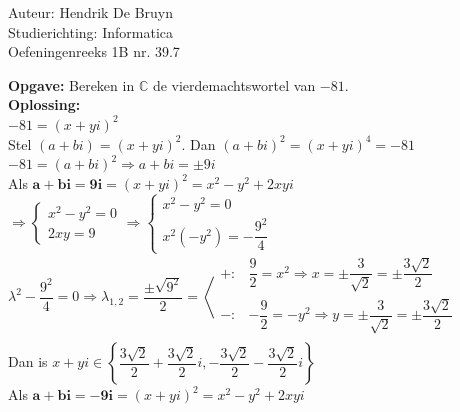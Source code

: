 \documentclass[a4paper]{article}
\begin{document}
\noindent \large Auteur: Hendrik De Bruyn \\
\noindent \large Studierichting: Informatica\\
\noindent \large Oefeningenreeks 1B nr. 39.7\\

\medskip

\normalsize

\textbf{Opgave: } Bereken in $\mathbb{C}$ de vierdemachtswortel van $-81$. \\

\textbf{Oplossing: } \\

$-81 = (x+yi)^2$ \\

Stel $(a+bi) = (x+yi)^2$. Dan $(a+bi)^2 = (x+yi)^4 = -81$ \\

$-81 = (a+bi)^2 \Rightarrow a+bi = \pm 9i$ \\

Als $\pmb{a+bi = 9i} = (x+yi)^2 = x^2 - y^2 + 2xyi $ \\

$\Rightarrow \left\{\begin{array}{l}
		x^2 - y^2 = 0 \\
		2xy = 9
	\end{array}\right. \Rightarrow \left\{\begin{array}{l}
		x^2 - y^2 = 0 \\
		x^2(-y^2) = -\dfrac{9^2}{4}
	\end{array}\right.$ \\

$\lambda^2 - \dfrac{9^2}{4} = 0 \Rightarrow \lambda_{1,2} = \dfrac{\pm \sqrt{9^2}}{2} = \left<\begin{array}{ll}
		+: & \dfrac{9}{2} = x^2 \Rightarrow x = \pm \dfrac{3}{\sqrt{2}} = \pm \dfrac{3\sqrt{2}}{2}   \\
		-: & -\dfrac{9}{2} = -y^2 \Rightarrow y = \pm \dfrac{3}{\sqrt{2}} = \pm \dfrac{3\sqrt{2}}{2} \\
	\end{array}\right.$ \\

Dan is $x+yi \in \left\{ \dfrac{3\sqrt{2}}{2}+\dfrac{3\sqrt{2}}{2}i, -\dfrac{3\sqrt{2}}{2}-\dfrac{3\sqrt{2}}{2}i \right\}$ \\

Als $\pmb{a+bi = -9i} = (x+yi)^2 = x^2 - y^2 + 2xyi $ \\
\end{document}

